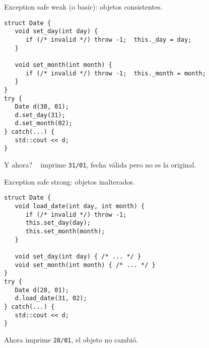 \begin{frame}[fragile]{Exception safe weak (o basic): objetos consistentes.}
   \begin{lstlisting}[style=normal]
struct Date {
   void set_day(int day) {
      if (/* invalid */) throw -1;  this._day = day;
   }

   void set_month(int month) {
      if (/* invalid */) throw -1;  this._month = month;
   }
}
try {
   Date d(30, 01);
   d.set_day(31);
   d.set_month(02);
} catch(...) {
   std::cout << d;
}
   \end{lstlisting}
Y ahora?
~%
\pause
imprime \lstinline[style=normal]!31/01!, fecha v\'alida pero no es la original.
~%
\end{frame}

\begin{frame}[fragile]{Exception safe strong: objetos inalterados.}
   \begin{lstlisting}[style=normal]
struct Date {
   void load_date(int day, int month) {
      if (/* invalid */) throw -1;
      this.set_day(day);
      this.set_month(month);
   }

   void set_day(int day) { /* ... */ }
   void set_month(int month) { /* ... */ }
}
try {
   Date d(28, 01);
   d.load_date(31, 02);
} catch(...) {
   std::cout << d;
}
   \end{lstlisting}
Ahora imprime \lstinline[style=normal]!28/01!, el objeto \alert{no cambi\'o}.
\end{frame}

